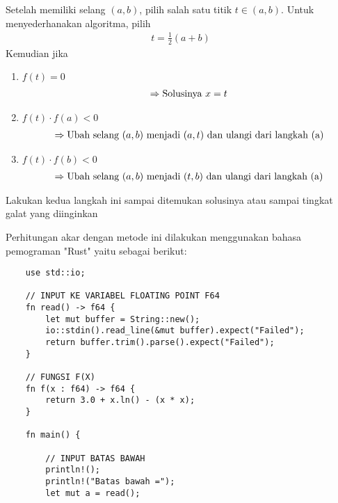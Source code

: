 \documentclass[12pt]{article}
\begin{document}
\begin{enumerate}
{\begin{enumerate}
{                Setelah memiliki selang $ (a,b) $, pilih salah satu titik $ t \in (a,b) $. Untuk menyederhanakan algoritma, pilih 
                \begin{align*}
                    t = \frac{1}{2}(a + b) 
                \end{align*}
                Kemudian jika
                \begin{enumerate}
                    \item {
                        $ f(t) = 0 $
                        \begin{align*}
                            \Rightarrow \text{Solusinya $ x = t $}
                        \end{align*}
                    }
                    \item {
                        $ f(t) \cdot f(a) < 0 $
                        \begin{align*}
                            \Rightarrow \text{Ubah selang $ (a,b) $ menjadi $ (a,t) $ dan ulangi dari langkah (a)}
                        \end{align*}
                    }
                    \item {
                        $ f(t) \cdot f(b) < 0 $
                        \begin{align*}
                            \Rightarrow \text{Ubah selang $ (a,b) $ menjadi $ (t,b) $ dan ulangi dari langkah (a)}
                        \end{align*}
                    }
                \end{enumerate}
            }
        \end{enumerate}
        Lakukan kedua langkah ini sampai ditemukan solusinya atau sampai tingkat galat yang diinginkan \bigskip

        Perhitungan akar dengan metode ini dilakukan menggunakan bahasa pemograman "Rust" yaitu sebagai berikut:
        \begin{lstlisting}
    use std::io;

    // INPUT KE VARIABEL FLOATING POINT F64
    fn read() -> f64 {
        let mut buffer = String::new();
        io::stdin().read_line(&mut buffer).expect("Failed");
        return buffer.trim().parse().expect("Failed");
    }

    // FUNGSI F(X)
    fn f(x : f64) -> f64 {
        return 3.0 + x.ln() - (x * x);
    }

    fn main() {

        // INPUT BATAS BAWAH 
        println!();
        println!("Batas bawah =");
        let mut a = read();


\end{lstlisting}}
\end{enumerate}
\end{document}
